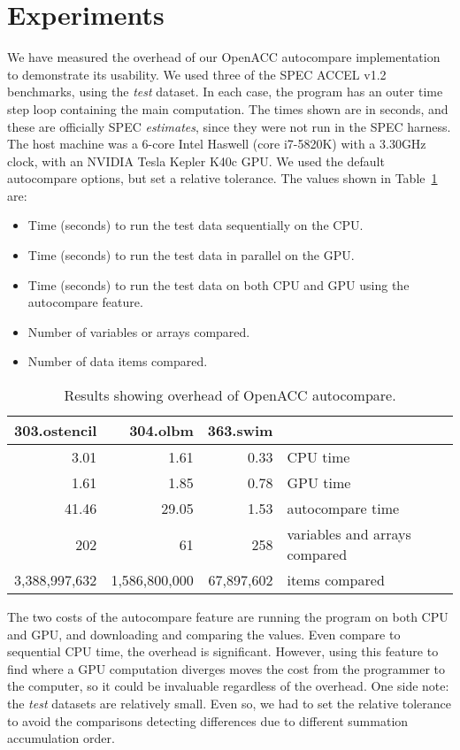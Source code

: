 \section{Experiments}

We have measured the overhead of our OpenACC autocompare implementation to demonstrate its usability.
We used three of the SPEC ACCEL v1.2 benchmarks, using the \emph{test} dataset.
In each case, the program has an outer time step loop containing the main computation.
The times shown are in seconds, and these are officially SPEC \emph{estimates}, since they were not run in the SPEC harness.
The host machine was a 6-core Intel Haswell (core i7-5820K) with a 3.30GHz clock, with an NVIDIA Tesla Kepler K40c GPU.
We used the default autocompare options, but set a relative tolerance.
The values shown in Table~\ref{res1} are:
\begin{itemize}
\item Time (seconds) to run the test data sequentially on the CPU.
\item Time (seconds) to run the test data in parallel on the GPU.
\item Time (seconds) to run the test data on both CPU and GPU using the autocompare feature.
\item Number of variables or arrays compared.
\item Number of data items compared.
\end{itemize}

\begin{table}
\begin{center}
\begin{tabular}{rrrl}
\hline
303.ostencil & 304.olbm & 363.swim & \\
\hline
 3.01 &  1.61 & 0.33 & CPU time \\
 1.61 &  1.85 & 0.78 & GPU time\\
41.46 & 29.05 & 1.53 & autocompare time \\
202 & 61 & 258 & variables and arrays compared \\
3,388,997,632 & 1,586,800,000 & 67,897,602 & items compared \\
\hline
\end{tabular}
\end{center}
\caption{Results showing overhead of OpenACC autocompare.}
\label{res1}
\end{table}

The two costs of the autocompare feature are running the program on both CPU and GPU, and downloading and comparing the values.
Even compare to sequential CPU time, the overhead is significant.
However, using this feature to find where a GPU computation diverges moves the cost from the programmer to the computer, so it could be invaluable regardless of the overhead.
One side note: the \emph{test} datasets are relatively small.
Even so, we had to set the relative tolerance to avoid the comparisons detecting differences due to different summation accumulation order.
